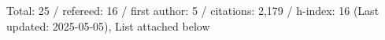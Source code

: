 Total: 25 / refereed: 16 / first author: 5 / citations: 2,179 / h-index: 16 (Last updated: 2025-05-05), List attached below